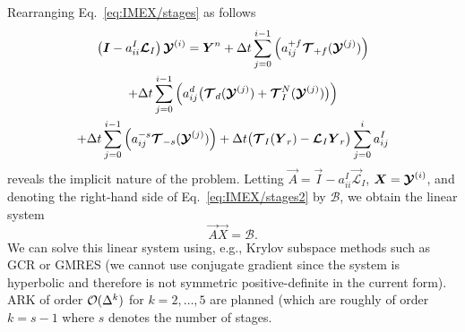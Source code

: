 \documentclass{report}
\begin{document}
{Rearranging Eq.~\eqref{eq:IMEX/stages} as follows 
\begin{multline}\label{eq:IMEX/stages2}
\left( \boldsymbol{{I}} - {a}^{I}_{ii}\boldsymbol{{\mathcal{L}}}_{I} \right)  \boldsymbol{{\mathcal{Y}}}^{(i)}  =  \boldsymbol{{Y}}^n + 
\Delta t \sum_{j=0}^{i-1} \left( {a}^{+f}_{ij} \boldsymbol{{\mathcal{T}}}_{+f}(\boldsymbol{{\mathcal{Y}}}^{(j)}) \right)   \\
+ \Delta t \sum_{j=0}^{i-1} \left( {a}^{d}_{ij} \bigl(\boldsymbol{{\mathcal{T}}}_{d}(\boldsymbol{{\mathcal{Y}}}^{(j)}) + \boldsymbol{{\mathcal{T}}}^N_I(\boldsymbol{{\mathcal{Y}}}^{(j)})\bigr) \right) \\
+ \Delta t \sum_{j=0}^{i-1} \left( {a}^{-s}_{ij} \boldsymbol{{\mathcal{T}}}_{-s}(\boldsymbol{{\mathcal{Y}}}^{(j)}) \right) + \Delta t \bigl(\boldsymbol{{\mathcal{T}}}_I(\boldsymbol{{Y}}_r) - \boldsymbol{{\mathcal{L}}}_I \boldsymbol{{Y}}_r \bigr) \sum_{j=0}^i a_{ij}^I
\end{multline}
reveals the implicit nature of the problem. Letting $\vec{A}=\vec{I} - {a}^{I}_{ii} \vec{\mathcal{L}}_{I}$, $\boldsymbol{{X}}=\boldsymbol{{\mathcal{Y}}}^{(i)}$, and denoting the right-hand side of Eq.~\eqref{eq:IMEX/stages2} by $\mathcal{B}$, we obtain the linear system 
\[
\vec{A} \vec{X} = \mathcal{B}.
\]
We can solve this linear system using, e.g., Krylov subspace methods such as GCR or GMRES (we cannot use conjugate gradient since the system is hyperbolic and therefore is not symmetric positive-definite in the current form). ARK of order $\mathcal{O}(\Delta ^k)$ for $k=2,\ldots,5$ are planned (which are roughly of order $k=s-1$ where $s$ denotes the number of stages.
}
\end{document}
